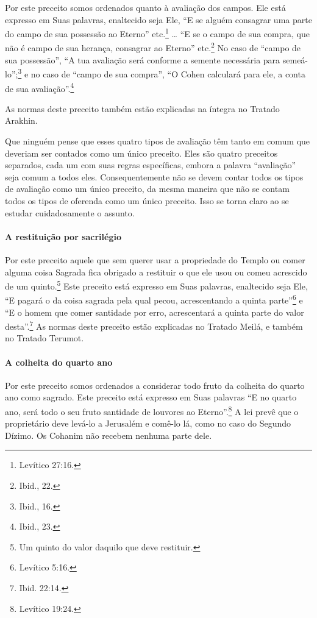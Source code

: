Por este preceito somos ordenados quanto à avaliação dos campos. Ele
está expresso em Suas palavras, enaltecido seja Ele, ``E se alguém
consagrar uma parte do campo de sua possessão ao Eterno'' etc.\footnote{Levítico
27:16.} \ldots{} ``E se o campo de sua compra, que não é campo de sua herança,
consagrar ao Eterno'' etc.\footnote{Ibid., 22.} No caso de ``campo de sua
possessão'', ``A tua avaliação será conforme a semente necessária para
semeá-lo'';\footnote{Ibid., 16.} e no caso de ``campo de sua compra'', ``O
Cohen calculará para ele, a conta de sua avaliação''.\footnote{Ibid., 23.}

As normas deste preceito também estão explicadas na íntegra no Tratado Arakhin.

Que ninguém pense que esses quatro tipos de avaliação têm tanto em comum
que deveriam ser contados como um único preceito. Eles são quatro
preceitos separados, cada um com suas regras específicas, embora a
palavra ``avaliação'' seja comum a todos eles. Consequentemente não se
devem contar todos os tipos de avaliação como um único preceito, da
mesma maneira que não se contam todos os tipos de oferenda como um único
preceito. Isso se torna claro ao se estudar cuidadosamente o assunto.

\paragraph{A restituição por sacrilégio}

Por este preceito aquele que sem querer usar a propriedade do Templo ou
comer alguma coisa Sagrada fica obrigado a restituir o que ele usou ou
comeu acrescido de um quinto.\footnote{Um quinto do valor daquilo que deve restituir.} Este preceito está
expresso em Suas palavras, enaltecido seja Ele, ``E pagará o da coisa
sagrada pela qual pecou, acrescentando a quinta parte''\footnote{Levítico 5:16.}
e ``E o homem que comer santidade por erro, acrescentará a quinta parte
do valor desta''.\footnote{Ibid. 22:14.} As normas deste preceito estão
explicadas no Tratado Meilá, e também no Tratado Terumot.

\paragraph{A colheita do quarto ano}

Por este preceito somos ordenados a considerar todo fruto da colheita
do quarto ano como sagrado. Este preceito está expresso em Suas
palavras ``E no quarto ano, será todo o seu fruto santidade de louvores
ao Eterno''.\footnote{Levítico 19:24.} A lei prevê que o proprietário deve
levá-lo a Jerusalém e comê-lo lá, como no caso do Segundo Dízimo. Os
Cohanim não recebem nenhuma parte dele.

